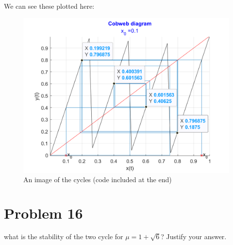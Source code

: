 \documentclass[12pt,letterpaper]{article}
\theoremstyle{definition}
\begin{document}
\begin{changemargin}{.5cm}{0cm}
\begin{enumerate}[label=(\alph*)]
    We can see these plotted here:
    \begin{figure}[H]
        \centering
        \includegraphics[width=.6\textwidth]{images/problem_15_cycles.png}
        \caption{An image of the cycles (code included at the end)}
        \label{fig:b2cycles}
    \end{figure}
\end{enumerate}


    \end{changemargin}

\section*{Problem 16}

what is the stability of the two cycle for $\mu = 1 +\sqrt{6}$? Justify your answer.
\end{document}
